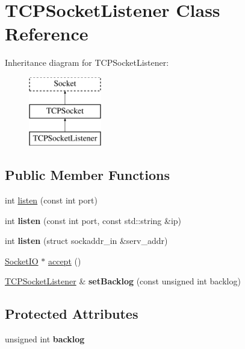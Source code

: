 \hypertarget{classTCPSocketListener}{\section{T\-C\-P\-Socket\-Listener Class Reference}
\label{classTCPSocketListener}
}
Inheritance diagram for T\-C\-P\-Socket\-Listener\-:\begin{figure}[H]
\begin{center}
\leavevmode
\includegraphics[height=3.000000cm]{classTCPSocketListener}
\end{center}
\end{figure}
\subsection*{Public Member Functions}
\begin{DoxyCompactItemize}
\item 
int \hyperlink{classTCPSocketListener_ac0f2aae9fd85f916c6d9cd05f4bfd7ef}{listen} (const int port)
\item 
\hypertarget{classTCPSocketListener_a693cccd1b9f304f746d8780d33248875}{int {\bfseries listen} (const int port, const std\-::string \&ip)}\label{classTCPSocketListener_a693cccd1b9f304f746d8780d33248875}

\item 
\hypertarget{classTCPSocketListener_af8455db0b7c454b3ba0b4ac2d4b9cd1c}{int {\bfseries listen} (struct sockaddr\-\_\-in \&serv\-\_\-addr)}\label{classTCPSocketListener_af8455db0b7c454b3ba0b4ac2d4b9cd1c}

\item 
\hyperlink{classSocketIO}{Socket\-I\-O} $\ast$ \hyperlink{classTCPSocketListener_a4cff944e470d8ef76807bceb3b6ce349}{accept} ()
\item 
\hypertarget{classTCPSocketListener_a7f098a2870d74ce9c87a774e1caaac77}{\hyperlink{classTCPSocketListener}{T\-C\-P\-Socket\-Listener} \& {\bfseries set\-Backlog} (const unsigned int backlog)}\label{classTCPSocketListener_a7f098a2870d74ce9c87a774e1caaac77}

\end{DoxyCompactItemize}
\subsection*{Protected Attributes}
\begin{DoxyCompactItemize}
\item 
\hypertarget{classTCPSocketListener_a1a166893f50a3668450bb155cfe24654}{unsigned int {\bfseries backlog}}\label{classTCPSocketListener_a1a166893f50a3668450bb155cfe24654}

\end{DoxyCompactItemize}
